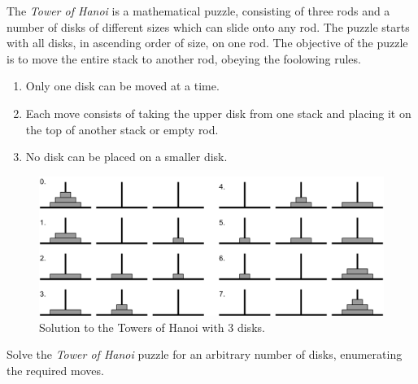 

\problem The {\em Tower of Hanoi} is a mathematical puzzle, consisting of three rods and a number of disks of different sizes which
can slide onto any rod. The puzzle starts with all disks, in ascending order of size, on one rod. The objective of the puzzle is to
move the entire stack to another rod, obeying the foolowing rules.
\begin{enumerate}
	\item Only one disk can be moved at a time.
	\item Each move consists of taking the upper disk from one stack and placing it on the top of another stack or empty rod.
	\item No disk can be placed on a smaller disk.
\end{enumerate}

\begin{figure}[h]
	\begin{center}
		\includegraphics[scale=0.7]{hanoi.png}
	\end{center}
	\caption*{Solution to the Towers of Hanoi with 3 disks.}
	\label{fig:hanoi_solved}
\end{figure}

Solve the {\em Tower of Hanoi} puzzle for an arbitrary number of disks, enumerating the required moves.
